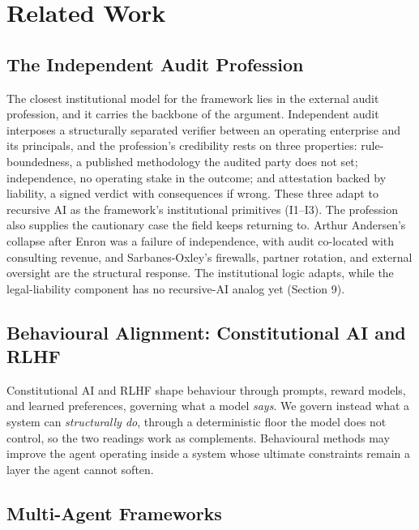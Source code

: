 \documentclass[11pt]{article}
\begin{document}
\section{Related Work}

\subsection{The Independent Audit Profession}

The closest institutional model for the framework lies in the external audit profession, and it carries the backbone of the argument. Independent audit interposes a structurally separated verifier between an operating enterprise and its principals, and the profession's credibility rests on three properties: rule-boundedness, a published methodology the audited party does not set; independence, no operating stake in the outcome; and attestation backed by liability, a signed verdict with consequences if wrong. These three adapt to recursive AI as the framework's institutional primitives (I1--I3). The profession also supplies the cautionary case the field keeps returning to. Arthur Andersen's collapse after Enron was a failure of independence, with audit co-located with consulting revenue, and Sarbanes-Oxley's firewalls, partner rotation, and external oversight are the structural response. The institutional logic adapts, while the legal-liability component has no recursive-AI analog yet (Section 9).

\subsection{Behavioural Alignment: Constitutional AI and RLHF}

Constitutional AI \citep{bai2022} and RLHF \citep{ouyang2022} shape behaviour through prompts, reward models, and learned preferences, governing what a model \emph{says}. We govern instead what a system can \emph{structurally do}, through a deterministic floor the model does not control, so the two readings work as complements. Behavioural methods may improve the agent operating inside a system whose ultimate constraints remain a layer the agent cannot soften.

\subsection{Multi-Agent Frameworks}
\end{document}
